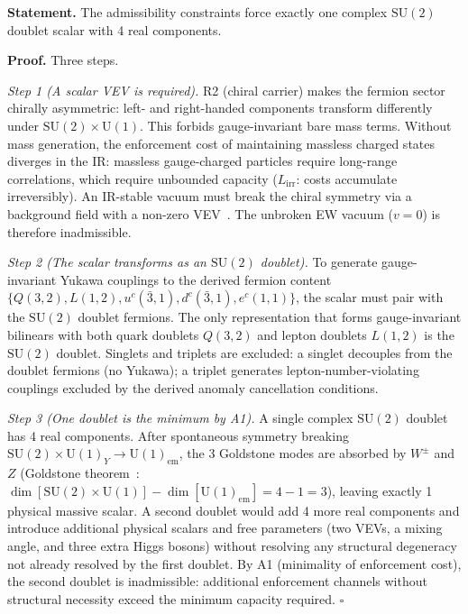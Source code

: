\documentclass[11pt]{article}
\newcommand{\SU}{\mathrm{SU}}
\newcommand{\U}{\mathrm{U}}
\begin{document}
\begin{tcolorbox}[apfbox, title={Theorem $T_{\mathrm{Higgs}}$ (Scalar Sector)}]
\textbf{Statement.}  The admissibility constraints force exactly one complex $\SU(2)$ doublet scalar with 4 real components.

\smallskip\noindent\textbf{Proof.}  Three steps.

\textit{Step 1 (A scalar VEV is required).}  R2 (chiral carrier) makes the fermion sector chirally asymmetric: left- and right-handed components transform differently under $\SU(2) \times \U(1)$.  This forbids gauge-invariant bare mass terms.  Without mass generation, the enforcement cost of maintaining massless charged states diverges in the IR: massless gauge-charged particles require long-range correlations, which require unbounded capacity ($L_{\mathrm{irr}}$: costs accumulate irreversibly).  An IR-stable vacuum must break the chiral symmetry via a background field with a non-zero VEV~\cite{Englert1964,Higgs1964}.  The unbroken EW vacuum ($v = 0$) is therefore inadmissible.

\textit{Step 2 (The scalar transforms as an $\SU(2)$ doublet).}  To generate gauge-invariant Yukawa couplings to the derived fermion content $\{Q(3,2), L(1,2), u^c(\bar{3},1), d^c(\bar{3},1), e^c(1,1)\}$, the scalar must pair with the $\SU(2)$ doublet fermions.  The only representation that forms gauge-invariant bilinears with both quark doublets $Q(3,2)$ and lepton doublets $L(1,2)$ is the $\SU(2)$ doublet.  Singlets and triplets are excluded: a singlet decouples from the doublet fermions (no Yukawa); a triplet generates lepton-number-violating couplings excluded by the derived anomaly cancellation conditions.

\textit{Step 3 (One doublet is the minimum by A1).}  A single complex $\SU(2)$ doublet has 4 real components.  After spontaneous symmetry breaking $\SU(2) \times \U(1)_Y \to \U(1)_{\mathrm{em}}$, the 3 Goldstone modes are absorbed by $W^\pm$ and $Z$ (Goldstone theorem~\cite{Goldstone1962}: $\dim[\SU(2) \times \U(1)] - \dim[\U(1)_{\mathrm{em}}] = 4 - 1 = 3$), leaving exactly 1 physical massive scalar.  A second doublet would add 4 more real components and introduce additional physical scalars and free parameters (two VEVs, a mixing angle, and three extra Higgs bosons) without resolving any structural degeneracy not already resolved by the first doublet.  By A1 (minimality of enforcement cost), the second doublet is inadmissible: additional enforcement channels without structural necessity exceed the minimum capacity required.  $\square$
\end{tcolorbox}
\end{document}
